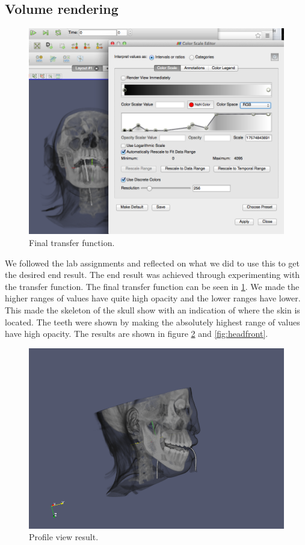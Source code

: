 \documentclass[a4paper]{article}
\begin{document}
\subsection{Volume rendering}

\begin{figure}[H]
    \includegraphics[width=1\linewidth]{lab5/head-transfer-function.png}
    \caption{Final transfer function.}
    \label{fig:volume}
\end{figure}

We followed the lab assignments and reflected on what we did to use this to get
the desired end result. The end result was achieved through experimenting with
the transfer function. The final transfer function can be seen in
\ref{fig:volume}. We made the higher ranges of values have quite high opacity
and the lower ranges have lower. This made the skeleton of the skull show with
an indication of where the skin is located. The teeth were shown by making the
absolutely highest range of values have high opacity. The results are shown in
figure \ref{fig:headprof} and \ref{fig:headfront}.

\begin{figure}[H]
    \includegraphics[width=1\linewidth]{lab5/head-profile-screenshot.png}
    \caption{Profile view result.}
    \label{fig:headprof}
\end{figure}
\end{document}
